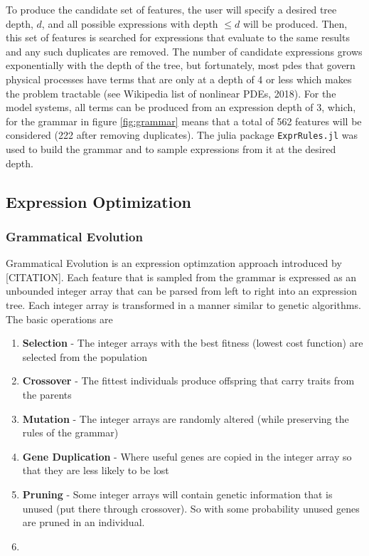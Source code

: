 \documentclass{article}
\begin{document}
To produce the candidate set of features, the user will specify a desired tree depth, $d$, and all possible expressions with depth $\leq d$ will be produced. Then, this set of features is searched for expressions that evaluate to the same results and any such duplicates are removed. The number of candidate expressions grows exponentially with the depth of the tree, but fortunately, most pdes that govern physical processes have terms that are only at a depth of 4 or less which makes the problem tractable (see Wikipedia list of nonlinear PDEs, 2018). For the model systems, all terms can be produced from an expression depth of 3, which, for the grammar in figure \ref{fig:grammar} means that a total of 562 features will be considered (222 after removing duplicates). The julia package \verb|ExprRules.jl| was used to build the grammar and to sample expressions from it at the desired depth.

\subsection{Expression Optimization}

\subsubsection{Grammatical Evolution}
Grammatical Evolution is an expression optimzation approach introduced by [CITATION]. Each feature that is sampled from the grammar is expressed as an unbounded integer array that can be parsed from left to right into an expression tree. Each integer array is transformed in a manner similar to genetic algorithms. The basic operations are
\begin{enumerate}
\item \textbf{Selection} - The integer arrays with the best fitness (lowest cost function) are selected from the population
\item \textbf{Crossover} - The fittest individuals produce offspring that carry traits from the parents
\item \textbf{Mutation} - The integer arrays are randomly altered (while preserving the rules of the grammar)
\item \textbf{Gene Duplication} - Where useful genes are copied in the integer array so that they are less likely to be lost
\item \textbf{Pruning} - Some integer arrays will contain genetic information that is unused (put there through crossover). So with some probability unused genes are pruned in an individual.
\item
\end{enumerate}
\end{document}

